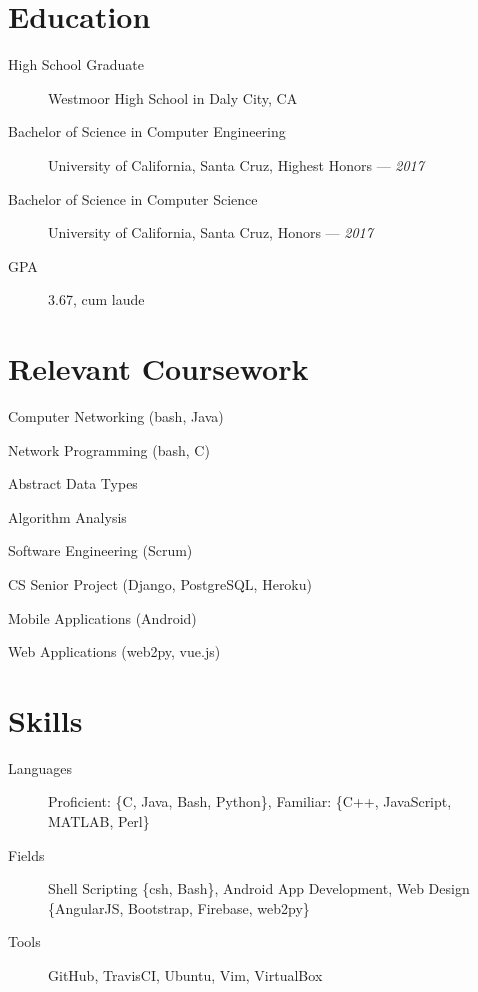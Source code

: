 \documentclass[10pt]{article}
\author{August Valera}
\begin{document}

\section*{Education}
\begin{description}
  \item[High School Graduate] Westmoor High School in Daly City, CA
  \item[Bachelor of Science in Computer Engineering] University of California,
    Santa Cruz, Highest Honors --- \textit{2017}
  \item[Bachelor of Science in Computer Science] University of California, Santa
    Cruz, Honors --- \textit{2017}
  \item[GPA] 3.67, cum laude
\end{description}

\section*{Relevant Coursework}
\begin{itemize}
  \begin{multicols}{2}
  \item Computer Networking (bash, Java) %
  \item Network Programming (bash, C) %
  \item Abstract Data Types %
  \item Algorithm Analysis %
  \item Software Engineering (Scrum) %
  \item CS Senior Project (Django, PostgreSQL, Heroku) %
  \item Mobile Applications (Android) %
  \item Web Applications (web2py, vue.js) %
  \end{multicols}
\end{itemize}

\section*{Skills}
\begin{description}
  \item[Languages] Proficient: \{C, Java, Bash, Python\},
    Familiar: \{C++, JavaScript, MATLAB, Perl\}
  \item[Fields] Shell Scripting \{csh, Bash\}, Android App Development, Web
    Design \{AngularJS, Bootstrap, Firebase, web2py\}
  \item[Tools] GitHub, TravisCI, Ubuntu, Vim, VirtualBox
\end{description}
\end{document}
